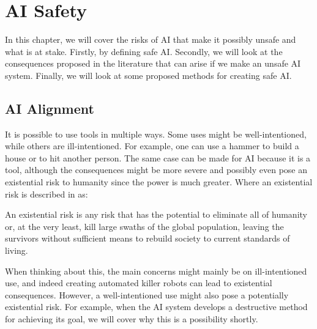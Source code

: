 \documentclass[12pt,A4]{report}
\theoremstyle{definition}
\begin{document}


\chapter{AI Safety}
In this chapter, we will cover the risks of AI that make it possibly unsafe and what is at stake. Firstly, by defining safe AI. Secondly, we will look at the consequences proposed in the literature that can arise if we make an unsafe AI system. Finally, we will look at some proposed methods for creating safe AI. 

\section{AI Alignment}
It is possible to use tools in multiple ways. Some uses might be well-intentioned, while others are ill-intentioned. For example, one can use a hammer to build a house or to hit another person. The same case can be made for AI because it is a tool, although the consequences might be more severe and possibly even pose an existential risk to humanity since the power is much greater. Where an existential risk is described in \citet{FLI} as:
\begin{displayquote}
An existential risk is any risk that has the potential to eliminate all of humanity or, at the very least, kill large swaths of the global population, leaving the survivors without sufficient means to rebuild society to current standards of living.
\end{displayquote}

When thinking about this, the main concerns might mainly be on ill-intentioned use, and indeed creating automated killer robots can lead to existential consequences. However, a well-intentioned use might also pose a potentially existential risk. For example, when the AI system develops a destructive method for achieving its goal, we will cover why this is a possibility shortly. 

\end{document}
